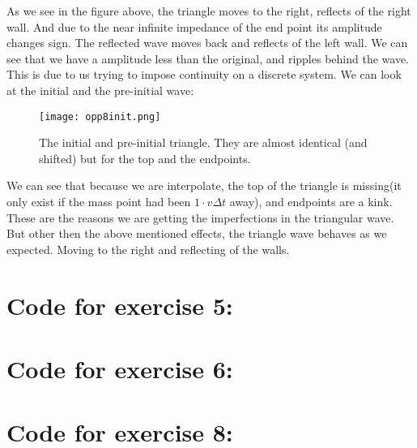 \documentclass[a4paper,norsk, 10pt]{article}
\begin{document}
As we see in the figure above, the triangle moves to the right, reflects of the right wall. And due to the near infinite impedance of the end point its amplitude changes sign. The reflected wave moves back and reflects of the left wall. We can see that we have a amplitude less than the original, and ripples behind the wave. This is due to us trying to impose continuity on a discrete system. We can look at the initial and the pre-initial wave:

\begin{figure}[H]
\centering
\texttt{[image: opp8init.png]}
\caption{The initial and pre-initial triangle. They are almost identical (and shifted) but for the top and the endpoints.}
\end{figure}

We can see that because we are interpolate, the top of the triangle is missing(it only exist if the mass point had been $1\cdot v\Delta t$ away), and endpoints are a kink. These are the reasons we are getting the imperfections in the triangular wave.\\

But other then the above mentioned effects, the triangle wave behaves as we expected. Moving to the right and reflecting of the walls.









\appendix

\section{Code for exercise 5:}


\section{Code for exercise 6:}


\section{Code for exercise 8:}

\end{document}
